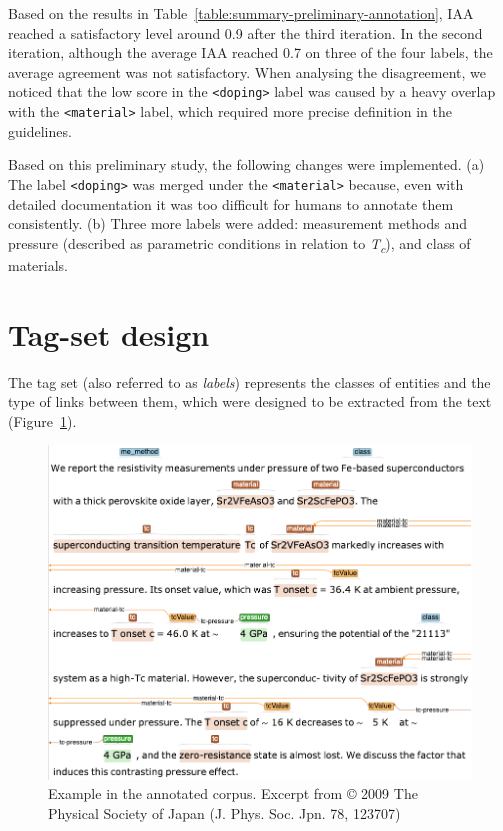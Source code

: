 Based on the results in Table~\ref{table:summary-preliminary-annotation}, IAA reached a satisfactory level around 0.9 after the third iteration. 
In the second iteration, although the average IAA reached 0.7 on three of the four labels, the average agreement was not satisfactory. 
When analysing the disagreement, we noticed that the low score in the \texttt{<doping>} label was caused by a heavy overlap with the \texttt{<material>} label, which required more precise definition in the guidelines. 

Based on this preliminary study, the following changes were implemented. 
(a) The label \texttt{<doping>} was merged under the \texttt{<material>} because, even with detailed documentation it was too difficult for humans to annotate them consistently.
(b) Three more labels were added: measurement methods and pressure (described as parametric conditions in relation to \textit{T\textsubscript{c}}), and class of materials. 

\section{Tag-set design}
The tag set (also referred to as \textit{labels}) represents the classes of entities and the type of links between them, which were designed to be extracted from the text (Figure~\ref{fig:example-annotations-and-links}).

\begin{figure}[htbp]
  \centering
  \includegraphics[width=\linewidth]{figures/supermat/Fig1.png}
  \caption{Example in the annotated corpus. Excerpt from © 2009 The Physical Society of Japan (J. Phys. Soc. Jpn. 78, 123707)}
  \label{fig:example-annotations-and-links}
\end{figure}


